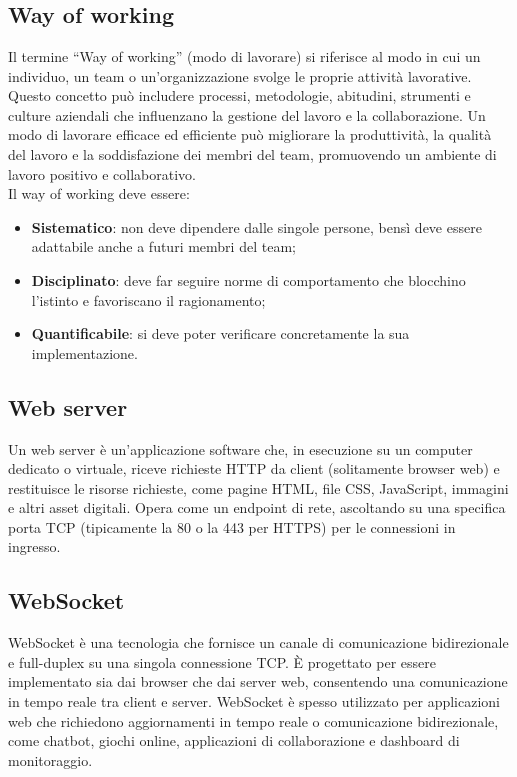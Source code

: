 
\section{}

\hypertarget{sec:way_of_working}{}
\subsection*{Way of working}
Il termine “Way of working” (modo di lavorare) si riferisce al modo in cui un individuo, un team o un’organizzazione svolge le proprie attività lavorative. 
Questo concetto può includere processi, metodologie, abitudini, strumenti e culture aziendali che influenzano la gestione del lavoro e la collaborazione. 
Un modo di lavorare efficace ed efficiente può migliorare la produttività, la qualità del lavoro e la soddisfazione dei membri del team, promuovendo un 
ambiente di lavoro positivo e collaborativo. \\
Il way of working deve essere:
\begin{itemize}
    \item \textbf{Sistematico}: non deve dipendere dalle singole persone, bensì deve essere adattabile anche a futuri membri del team;
    \item \textbf{Disciplinato}: deve far seguire norme di comportamento che blocchino l'istinto e favoriscano il ragionamento;
    \item \textbf{Quantificabile}: si deve poter verificare concretamente la sua implementazione.
\end{itemize}

\hypertarget{sec:web_server}{}
\subsection*{Web server}
Un web server è un'applicazione software che, in esecuzione su un computer dedicato o virtuale, riceve richieste HTTP da client 
(solitamente browser web) e restituisce le risorse richieste, come pagine HTML, file CSS, JavaScript, immagini e altri asset digitali. 
Opera come un endpoint di rete, ascoltando su una specifica porta TCP (tipicamente la 80 o la 443 per HTTPS) per le connessioni in 
ingresso.

\hypertarget{sec:websocket}{}
\subsection*{WebSocket}
WebSocket è una tecnologia che fornisce un canale di comunicazione bidirezionale e full-duplex su una singola connessione TCP.
È progettato per essere implementato sia dai browser che dai server web, consentendo una comunicazione in tempo reale tra client e server.
WebSocket è spesso utilizzato per applicazioni web che richiedono aggiornamenti in tempo reale o comunicazione bidirezionale, come chatbot, giochi online,
applicazioni di collaborazione e dashboard di monitoraggio.

